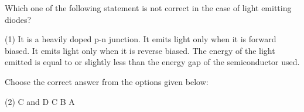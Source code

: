 \item Which one of the following statement is not correct in the case of light emitting diodes?
    \begin{tasks}(1)
        \task It is a heavily doped p-n junction.
        \task It emits light only when it is forward biased.
        \task It emits light only when it is reverse biased.
        \task The energy of the light emitted is equal to or slightly less than the energy gap of the semiconductor used.
    \end{tasks}
Choose the correct answer from the options given below:
    \begin{tasks}(2)
        \task C and D
        \task C
        \task B
        \task A
    \end{tasks}
